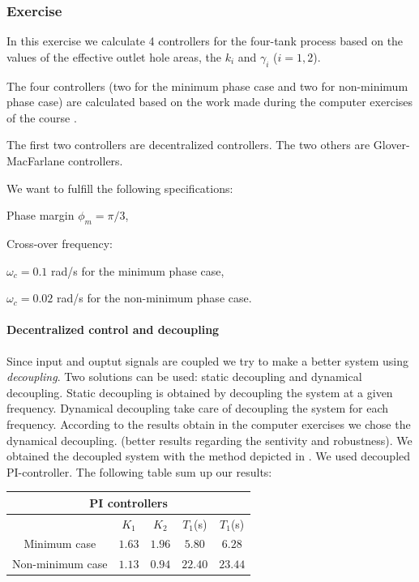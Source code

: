 \subsubsection{Exercise}

In this exercise we calculate 4 controllers for the four-tank process based on the values of the effective outlet hole areas, the $k_i$ and $\gamma_i$ ($i=1,2$). 

The four controllers (two for the minimum phase case and two for non-minimum phase case) are calculated based on the work made during the computer exercises of the course \cite{exo4}. 

The first two controllers are decentralized controllers. The two others are Glover-MacFarlane controllers.

We want to fulfill the following specifications:
\begin{shortitemize}
    \item Phase margin $\phi_m = \pi/3$,
    \item Cross-over frequency:
        \begin{shortitemize}
            \item $\omega_c = 0.1$ rad/s for the minimum phase case,
            \item $\omega_c = 0.02$ rad/s for the non-minimum phase case.
        \end{shortitemize}
\end{shortitemize}

\paragraph{Decentralized control and decoupling}

Since input and ouptut signals are coupled we try to make a better system using \emph{decoupling}. 
Two solutions can be used: static decoupling and dynamical decoupling. 
Static decoupling is obtained by decoupling the system at a given frequency.
Dynamical decoupling take care of decoupling the system for each frequency.
According to the results obtain in the computer exercises we chose the dynamical decoupling. (better results regarding the sentivity and robustness). 
We obtained the decoupled system with the method depicted in \cite{exo4}.
We used decoupled PI-controller. The following table sum up our results:

\begin{center}
\begin{tabular}{|c|cccc|}
    \hline
    \multicolumn{5}{|c|}{PI controllers} \\
    \hline
    & $K_1$ & $K_2$ & $T_1$(s) & $T_1$(s) \\ 
    Minimum case & $1.63$ & $1.96$ & $5.80$ & $6.28$\\
    Non-minimum case &  $1.13$ & $0.94$ & $22.40$ & $23.44$ \\
    \hline
\end{tabular}
\end{center}

